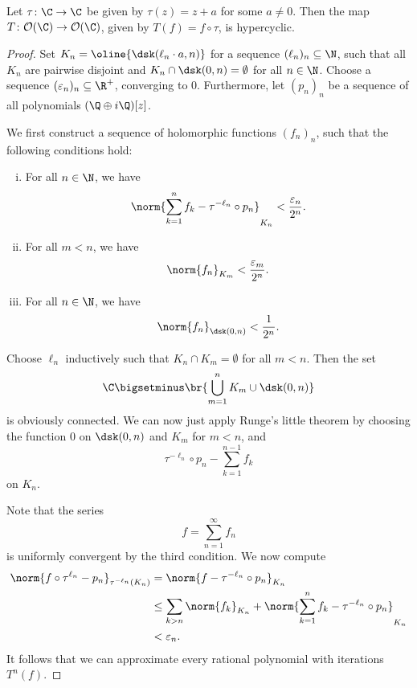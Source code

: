 \begin{izrek}[Birkhoff]
Let $\tau \colon \C \to \C$ be given by $\tau(z) = z + a$ for some
$a \ne 0$. Then the map
$T \colon \mathcal{O}(\C) \to \mathcal{O}(\C)$, given by
$T(f) = f \circ \tau$, is hypercyclic.
\end{izrek}

\begin{proof}
Set $K_n = \oline{\dsk(\ell_n \cdot a, n)}$ for a sequence
$(\ell_n)_n \subseteq \N$, such that all $K_n$ are pairwise
disjoint and $K_n \cap \dsk(0, n) = \emptyset$ for all $n \in \N$.
Choose a sequence $(\varepsilon_n)_n \subseteq \R^+$, converging to
$0$. Furthermore, let $(p_n)_n$ be a sequence of all polynomials
$(\Q \oplus i\Q)[z]$.

We first construct a sequence of holomorphic functions $(f_n)_n$,
such that the following conditions hold:

\begin{enumerate}[i)]
\item For all $n \in \N$, we have
\[
\norm{\sum_{k=1}^n f_k - \tau^{-\ell_n} \circ p_n}_{K_n} <
\frac{\varepsilon_n}{2^n}.
\]
\item For all $m < n$, we have
\[
\norm{f_n}_{K_m} < \frac{\varepsilon_m}{2^n}.
\]
\item For all $n \in \N$, we have
\[
\norm{f_n}_{\dsk(0,n)} < \frac{1}{2^n}.
\]
\end{enumerate}

Choose $\ell_n$ inductively such that $K_n \cap K_m = \emptyset$
for all $m < n$. Then the set
\[
\C \bigsetminus \br{\bigcup_{m=1}^n K_m \cup \dsk(0,n)}
\]
is obviously connected. We can now just apply Runge's little
theorem by choosing the function $0$ on $\dsk(0,n)$ and $K_m$ for
$m < n$, and
\[
\tau^{-\ell_n} \circ p_n - \sum_{k=1}^{n-1} f_k
\]
on $K_n$.

Note that the series
\[
f = \sum_{n=1}^\infty f_n
\]
is uniformly convergent by the third condition. We now compute
\begin{align*}
\norm{f \circ \tau^{\ell_n} - p_n}_{\tau^{-\ell_n}(K_n)} &=
\norm{f - \tau^{-\ell_n} \circ p_n}_{K_n}
\\
&\leq
\sum_{k > n} \norm{f_k}_{K_n} +
\norm{\sum_{k=1}^n f_k - \tau^{-\ell_n} \circ p_n}_{K_n}
\\
&<
\varepsilon_n.
\end{align*}
It follows that we can approximate every rational polynomial with
iterations $T^n(f)$.
\end{proof}

